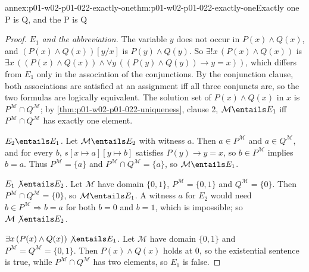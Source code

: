\begin{annexitem}{annex:p01-w02-p01-022-exactly-one}{thm:p01-w02-p01-022-exactly-one}{Exactly one P is Q, and the P is Q}
\begin{proof}
\emph{\(E_1\) and the abbreviation.} The variable \(y\) does not occur in
\(P(x)\land Q(x)\), and \((P(x)\land Q(x))[y/x]\) is \(P(y)\land Q(y)\). So
\(\exists!x\,(P(x)\land Q(x))\) is
\(\exists x\,((P(x)\land Q(x))\land\forall y\,((P(y)\land Q(y))\to y=x))\),
which differs from \(E_1\) only in the association of the conjunctions. By
the conjunction clause, both associations are satisfied at an assignment
iff all three conjuncts are, so the two formulas are logically equivalent.
The solution set of \(P(x)\land Q(x)\) in \(x\) is
\(P^{\mathcal M}\cap Q^{\mathcal M}\); by
\cref{thm:p01-w02-p01-022-uniqueness}, clause 2, \(\mathcal M\entails E_1\)
iff \(P^{\mathcal M}\cap Q^{\mathcal M}\) has exactly one element.

\emph{\(E_2\entails E_1\).} Let \(\mathcal M\entails E_2\) with witness
\(a\). Then \(a\in P^{\mathcal M}\) and \(a\in Q^{\mathcal M}\), and for
every \(b\), \(s[x\mapsto a][y\mapsto b]\) satisfies \(P(y)\to y=x\), so
\(b\in P^{\mathcal M}\) implies \(b=a\). Thus \(P^{\mathcal M}=\{a\}\) and
\(P^{\mathcal M}\cap Q^{\mathcal M}=\{a\}\), so \(\mathcal M\entails E_1\).

\emph{\(E_1\not\entails E_2\).} Let \(\mathcal M\) have domain \(\{0,1\}\),
\(P^{\mathcal M}=\{0,1\}\) and \(Q^{\mathcal M}=\{0\}\). Then
\(P^{\mathcal M}\cap Q^{\mathcal M}=\{0\}\), so \(\mathcal M\entails E_1\).
A witness \(a\) for \(E_2\) would need \(b\in P^{\mathcal M}\Rightarrow b=a\)
for both \(b=0\) and \(b=1\), which is impossible; so
\(\mathcal M\not\entails E_2\).

\emph{\(\exists x\,(P(x)\land Q(x))\not\entails E_1\).} Let \(\mathcal M\)
have domain \(\{0,1\}\) and \(P^{\mathcal M}=Q^{\mathcal M}=\{0,1\}\). Then
\(P(x)\land Q(x)\) holds at \(0\), so the existential sentence is true, while
\(P^{\mathcal M}\cap Q^{\mathcal M}\) has two elements, so \(E_1\) is false.
\end{proof}
\end{annexitem}

